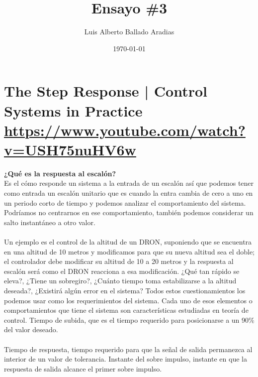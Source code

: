 \documentclass[
	12pt, %
]{fphw}
\title{Ensayo \#3} %
\author{Luis Alberto Ballado Aradias} %
\date{\today} %
\institute{Centro de Investigación y de Estudios Avanzados del IPN \\ Unidad Tamaulipas} %
\begin{document}
\maketitle %

\section*{{\color{Apricot}The Step Response | Control Systems in Practice} \url{https://www.youtube.com/watch?v=USH75nuHV6w}}

\textbf{¿Qué es la respuesta al escalón?} \\

Es el cómo responde un sistema a la entrada de un escalón así que podemos tener como entrada un escalón unitario que es cuando la entra cambia de cero a uno en un periodo corto de tiempo y podemos analizar el comportamiento del sistema. Podríamos no centrarnos en ese comportamiento, también podemos considerar un salto instantáneo a otro valor. \\\\

Un ejemplo es el control de la altitud de un DRON, suponiendo que se encuentra en una altitud de 10 metros y modificamos para que su nueva altitud sea el doble; el controlador debe modificar su altitud de 10 a 20 metros y la respuesta al escalón será como el DRON reacciona a esa modificación. ¿Qué tan rápido se eleva?, ¿Tiene un sobregiro?, ¿Cuánto tiempo toma estabilizarse a la altitud deseada?, ¿Existirá algún error en el sistema? Todos estos cuestionamientos los podemos usar como los requerimientos del sistema. Cada uno de esos elementos o comportamientos que tiene el sistema son características estudiadas en teoría de control.
Tiempo de subida, que es el tiempo requerido para posicionarse a un 90\% del valor deseado.\\\\

Tiempo de respuesta, tiempo requerido para que la señal de salida permanezca al interior de un valor de tolerancia.
Instante del sobre impulso, instante en que la respuesta de salida alcance el primer sobre impulso. \\\\
\end{document}
